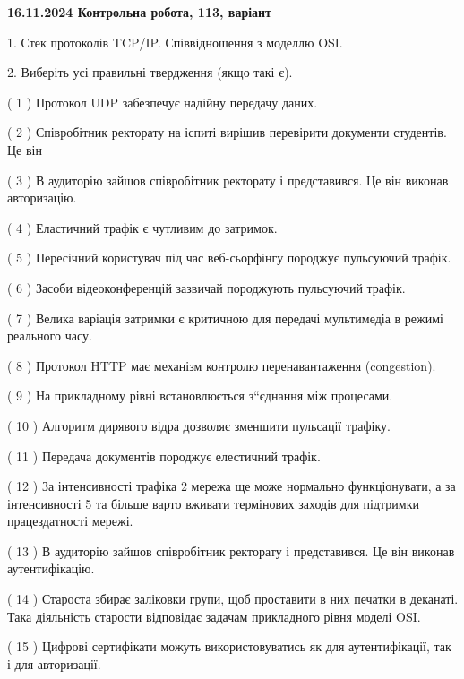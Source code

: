 \documentclass[12pt, ukrainian]{article}
\begin{document}
\vspace{4mm}
\newpage
\begin {large}

\textbf{16.11.2024 Контрольна робота, 113, варіант  }\par


{
1. Стек протоколів TCP/IP. Співвідношення з моделлю OSI.



\vspace{5mm}
2. Виберіть усі правильні твердження (якщо такі є).\par
\vspace{2mm}

( 1 ) Протокол UDP забезпечує надійну передачу даних.

( 2 ) Співробітник ректорату на іспиті вирішив перевірити документи студентів. Це він

( 3 ) В аудиторію зайшов співробітник ректорату і представився. Це він виконав авторизацію.

( 4 ) Еластичний трафік є чутливим до затримок.

( 5 ) Пересічний користувач під час веб-сьорфінгу породжує пульсуючий трафік.

( 6 ) Засоби відеоконференцій зазвичай породжують пульсуючий трафік.

( 7 ) Велика варіація затримки є критичною для передачі мультимедіа в режимі реального часу.

( 8 ) Протокол HTTP має механізм контролю перенавантаження (congestion).

( 9 ) На прикладному рівні встановлюється з“єднання між процесами.

( 10 ) Алгоритм дирявого відра дозволяє зменшити пульсації трафіку.

( 11 ) Передача документів породжує елестичний трафік.

( 12 ) За інтенсивності трафіка 2 мережа ще може нормально функціонувати, а за інтенсивності 5 та більше варто вживати термінових заходів для підтримки працездатності мережі.

( 13 ) В аудиторію зайшов співробітник ректорату і представився. Це він виконав аутентифікацію.

( 14 ) Староста збирає заліковки групи, щоб проставити в них печатки в деканаті. Така діяльність старости відповідає задачам прикладного рівня моделі OSI.

( 15 ) Цифрові сертифікати можуть використовуватись як для аутентифікації, так і для авторизації.
}
\end {large}
\end{document}
